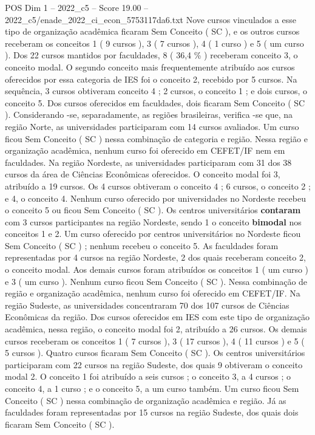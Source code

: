 \begin{textsample}{POS Dim 1 – 2022\_c5 – Score 19.00 – 2022\_c5/enade\_2022\_ci\_econ\_5753117da6.txt}
Nove cursos vinculados a esse tipo de organização acadêmica ficaram Sem Conceito ( SC ), e os outros cursos receberam os conceitos 1 ( 9 cursos ), 3 ( 7 cursos ), 4 ( 1 curso ) e 5 ( um curso ).
Dos 22 cursos mantidos por faculdades, 8 ( 36,4 \% ) receberam conceito 3, o conceito modal.
O segundo conceito mais frequentemente atribuído aos cursos oferecidos por essa categoria de IES foi o conceito 2, recebido por 5 cursos.
Na sequência, 3 cursos obtiveram conceito 4 ; 2 cursos, o conceito 1 ; e dois cursos, o conceito 5.
Dos cursos oferecidos em faculdades, dois ficaram Sem Conceito ( SC ).
Considerando -se, separadamente, as regiões brasileiras, verifica -se que, na região Norte, as universidades participaram com 14 cursos avaliados.
Um curso ficou Sem Conceito ( SC ) nessa combinação de categoria e região.
Nessa região e organização acadêmica, nenhum curso foi oferecido em CEFET/IF nem em faculdades.
Na região Nordeste, as universidades participaram com 31 dos 38 cursos da área de Ciências Econômicas oferecidos.
O conceito modal foi 3, atribuído a 19 cursos.
Os 4 cursos obtiveram o conceito 4 ; 6 cursos, o conceito 2 ; e 4, o conceito 4.
Nenhum curso oferecido por universidades no Nordeste recebeu o conceito 5 ou ficou Sem Conceito ( SC ).
Os centros universitários \textbf{contaram} com 3 cursos participantes na região Nordeste, sendo 1 o conceito \textbf{bimodal} nos conceitos 1 e 2.
Um curso oferecido por centros universitários no Nordeste ficou Sem Conceito ( SC ) ; nenhum recebeu o conceito 5.
As faculdades foram representadas por 4 cursos na região Nordeste, 2 dos quais receberam conceito 2, o conceito modal.
Aos demais cursos foram atribuídos os conceitos 1 ( um curso ) e 3 ( um curso ).
Nenhum curso ficou Sem Conceito ( SC ).
Nessa combinação de região e organização acadêmica, nenhum curso foi oferecido em CEFET/IF.
Na região Sudeste, as universidades concentraram 70 dos 107 cursos de Ciências Econômicas da região.
Dos cursos oferecidos em IES com este tipo de organização acadêmica, nessa região, o conceito modal foi 2, atribuído a 26 cursos.
Os demais cursos receberam os conceitos 1 ( 7 cursos ), 3 ( 17 cursos ), 4 ( 11 cursos ) e 5 ( 5 cursos ).
Quatro cursos ficaram Sem Conceito ( SC ).
Os centros universitários participaram com 22 cursos na região Sudeste, dos quais 9 obtiveram o conceito modal 2.
O conceito 1 foi atribuído a seis cursos ; o conceito 3, a 4 cursos ; o conceito 4, a 1 curso ; e o conceito 5, a um curso também.
Um curso ficou Sem Conceito ( SC ) nessa combinação de organização acadêmica e região.
Já as faculdades foram representadas por 15 cursos na região Sudeste, dos quais dois ficaram Sem Conceito ( SC ).

\end{textsample}
